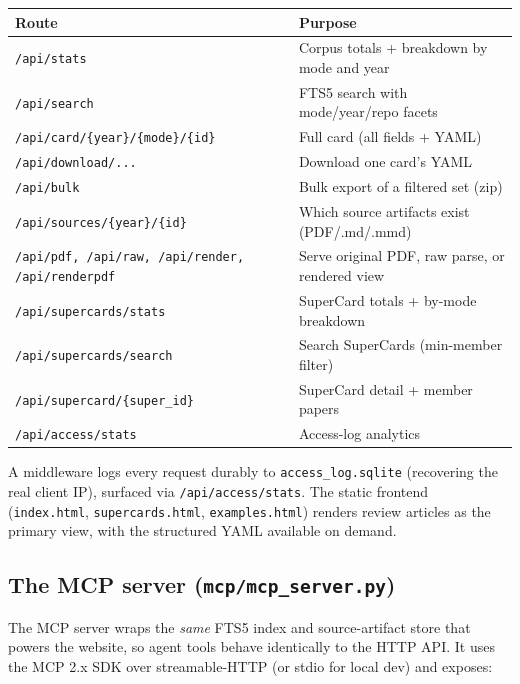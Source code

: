\documentclass[11pt,letterpaper]{article}
\newcommand{\code}[1]{\texttt{\small #1}}
\begin{document}
\begin{center}
\small
\begin{tabular}{@{}l p{8.6cm}@{}}
\toprule
\textbf{Route} & \textbf{Purpose} \\
\midrule
\code{/api/stats}                      & Corpus totals + breakdown by mode and year \\
\code{/api/search}                     & FTS5 search with mode/year/repo facets \\
\code{/api/card/\{year\}/\{mode\}/\{id\}} & Full card (all fields + YAML) \\
\code{/api/download/...}               & Download one card's YAML \\
\code{/api/bulk}                       & Bulk export of a filtered set (zip) \\
\code{/api/sources/\{year\}/\{id\}}    & Which source artifacts exist (PDF/.md/.mmd) \\
\code{/api/pdf, /api/raw, /api/render, /api/renderpdf} & Serve original PDF, raw parse, or rendered view \\
\code{/api/supercards/stats}           & SuperCard totals + by-mode breakdown \\
\code{/api/supercards/search}          & Search SuperCards (min-member filter) \\
\code{/api/supercard/\{super\_id\}}    & SuperCard detail + member papers \\
\code{/api/access/stats}               & Access-log analytics \\
\bottomrule
\end{tabular}
\end{center}

A middleware logs every request durably to \code{access\_log.sqlite} (recovering the
real client IP), surfaced via \code{/api/access/stats}. The static frontend
(\code{index.html}, \code{supercards.html}, \code{examples.html}) renders review
articles as the primary view, with the structured YAML available on demand.

\subsection{The MCP server (\code{mcp/mcp\_server.py})}

The MCP server wraps the \emph{same} FTS5 index and source-artifact store that powers
the website, so agent tools behave identically to the HTTP API. It uses the MCP 2.x
SDK over streamable-HTTP (or stdio for local dev) and exposes:
\end{document}
